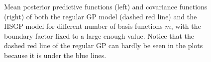\documentclass[onecolumn,a4paper,11pt]{article}
\begin{document}
\begin{figure}
\caption{Mean posterior predictive functions (left) and covariance functions (right) of both the regular GP model (dashed red line) and the HSGP model for different number of basis functions $m$, with the boundary factor fixed to a large enough value. Notice that the dashed red line of the regular GP can hardly be seen in the plots because it is under the blue lines.}
  \label{fig1_Post_J}
\end{figure}
\end{document}
